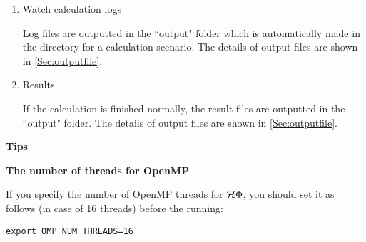 \begin{enumerate}
\item Watch calculation logs

Log files are outputted in the ``output" folder which is automatically made in the directory for a calculation scenario.
The details of output files are shown in \ref{Sec:outputfile}.

\item Results

If the calculation is finished normally, the result files are outputted in  the ``output" folder. The details of output files are shown in \ref{Sec:outputfile}.

\end{enumerate}

\begin{screen}
\Large 
{\bf Tips}
\normalsize

{\bf The number of threads for OpenMP}

If you specify the number of OpenMP threads for $\mathcal{H} \Phi$,
you should set it as follows (in case of 16 threads) before the running:
\begin{verbatim}
export OMP_NUM_THREADS=16
\end{verbatim}

\end{screen}

